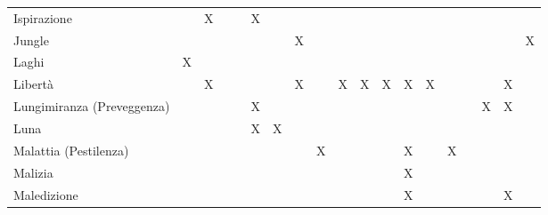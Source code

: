 \documentclass[10pt,a3paper]{memoir}
\begin{document}
\begin{table}[h]
\begin{tabular}{l|c|c|c|c|c|c|c|c|c|c|c|c|c|c|c|c|c|c}
Ispirazione &  & X &  &  & X &  &  &  &  &  &  &  &  &  &  &  &  &  \\
Jungle &  &  &  &  &  &  & X &  &  &  &  &  &  &  &  &  &  & X \\
Laghi & X &  &  &  &  &  &  &  &  &  &  &  &  &  &  &  &  &  \\
Libert\`{a} &  & X &  &  &  &  & X &  & X & X & X & X & X &  &  &  & X &  \\
Lungimiranza (Preveggenza) &  &  &  &  & X &  &  &  &  &  &  &  &  &  &  & X & X &  \\
Luna &  &  &  &  & X & X &  &  &  &  &  &  &  &  &  &  &  &  \\
Malattia (Pestilenza) &  &  &  &  &  &  &  & X &  &  &  & X &  & X &  &  &  &  \\
Malizia &  &  &  &  &  &  &  &  &  &  &  & X &  &  &  &  &  &  \\
Maledizione &  &  &  &  &  &  &  &  &  &  &  & X &  &  &  &  & X &  \\
\bottomrule
\end{tabular}
\end{table}
\end{document}
